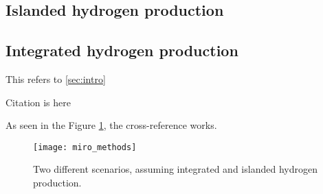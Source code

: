 \subsection{Islanded hydrogen production}
\subsection{Integrated hydrogen production}

This refers to \ref{sec:intro}

Citation is here \cite{Neumann2021}

As seen in the Figure \ref{fig:methods_scenarios}, the cross-reference works.

\begin{figure}[h!]
    \centering
    \texttt{[image: miro\_methods]}
    \caption{Two different scenarios, assuming integrated and islanded hydrogen production.}
    \label{fig:methods_scenarios}
\end{figure}

